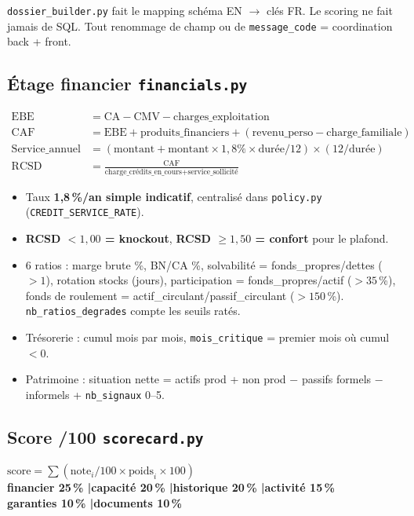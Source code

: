 \documentclass[11pt,a4paper]{article}
\newcommand{\C}[1]{{\small\texttt{\nolinkurl{#1}}}}
\begin{document}
\C{dossier_builder.py} fait le mapping schéma EN $\rightarrow$ clés FR. Le scoring ne fait jamais de SQL. Tout renommage de champ ou de \C{message_code} = coordination back + front.

\subsection{Étage financier \texttt{financials.py}}

\begin{align*}
\text{EBE} &= \text{CA} - \text{CMV} - \text{charges\_exploitation} \\
\text{CAF} &= \text{EBE} + \text{produits\_financiers} + (\text{revenu\_perso} - \text{charge\_familiale}) \\
\text{Service\_annuel} &= (\text{montant} + \text{montant} \times 1{,}8\% \times \text{durée}/12) \times (12/\text{durée}) \\
\text{RCSD} &= \frac{\text{CAF}}{\text{charge\_crédits\_en\_cours} + \text{service\_sollicité}}
\end{align*}

\begin{itemize}
  \item Taux \textbf{1,8\,\%/an simple indicatif}, centralisé dans \C{policy.py} (\C{CREDIT_SERVICE_RATE}).
  \item \textbf{RCSD $< 1{,}00$ = knockout}, \textbf{RCSD $\geq 1{,}50$ = confort} pour le plafond.
  \item 6 ratios : marge brute \%, BN/CA \%, solvabilité = fonds\_propres/dettes ($>1$), rotation stocks (jours), participation = fonds\_propres/actif ($>35$\,\%), fonds de roulement = actif\_circulant/passif\_circulant ($>150$\,\%). \C{nb_ratios_degrades} compte les seuils ratés.
  \item Trésorerie : cumul mois par mois, \C{mois_critique} = premier mois où cumul $<0$.
  \item Patrimoine : situation nette = actifs prod + non prod $-$ passifs formels $-$ informels + \C{nb_signaux} 0--5.
\end{itemize}

\subsection{Score /100 \texttt{scorecard.py}}

\begin{encadrebleu}
\centering $\text{score} = \sum (\text{note}_i/100 \times \text{poids}_i \times 100)$ \\[0.3em]
{\small\textbf{financier 25\,\% \enspace|\enspace capacité 20\,\% \enspace|\enspace historique 20\,\% \enspace|\enspace activité 15\,\%} \\[0.2em]
\textbf{garanties 10\,\% \enspace|\enspace documents 10\,\%}}
\end{encadrebleu}
\end{document}

